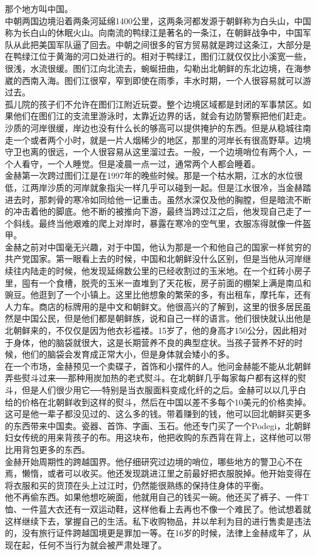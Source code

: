 那个地方叫中国。\\

中朝两国边境沿着两条河延绵1400公里，这两条河都发源于朝鲜称为白头山，中国称为长白山的休眠火山。向南流的鸭绿江是著名的一条江，在朝鲜战争中，中国军队从此把美国军队逼了回去。中朝之间很多的官方贸易就是跨过这条江，大部分是在鸭绿江位于黄海的河口处进行的。相对于鸭绿江，图们江就仅仅比小溪宽一些，很浅，水流很缓。图们江向北流去，蜿蜒扭曲，勾勒出北朝鲜的东北边境，在海参崴的西南入海。图们江很窄，窄到即使在雨季，丰水时期，一个人很容易就可以游过去。\\

孤儿院的孩子们不允许在图们江附近玩耍。整个边境区域都是封闭的军事禁区。如果他们在图们江的支流里游泳时，太靠近边界的话，就会有边防警察把他们赶走。沙质的河岸很缓，岸边也没有什么长的够高可以提供掩护的东西。但是从稳城往南走一个或者两个小时，就是一片人烟稀少的地区，那里的河岸长有很高野草。边境守卫也离的很远，一个人很容易从这里溜过去。一般，一个边境哨位有两个人，一个人看守，一个人睡觉。但是凌晨一点一过，通常两个人都会睡着。\\

金赫第一次跨过图们江是在1997年的晚些时候。那是一个枯水期，江水的水位很低，江两岸沙质的河岸就象指尖一样几乎可以碰到一起。但是江水很冷，当金赫踏进去时，那刺骨的寒冷如同给他一记重击。虽然水深仅及他的胸膛，但是暗流不断的冲击着他的脚底。他不断的被推向下游，最终当跨过江之后，他发现自己走了一个斜线。最终当他艰难的爬上对岸时，暴露在寒冷的空气里，衣服冻得就像一件盔甲。\\

金赫之前对中国毫无兴趣，对于中国，他认为那是一个和他自己的国家一样贫穷的共产党国家。第一眼看上去的时候，中国和北朝鲜没什么区别，但是当他从河岸继续往内陆走的时候，他发现延绵数公里的已经收割过的玉米地。在一个红砖小房子里，囤有一个食槽，脱壳的玉米一直堆到了天花板，房子前面的棚架上满是南瓜和豌豆。他逛到了一个小镇上。这里比他想象的繁荣的多，有出租车，摩托车，还有人力车。商店的标牌用的是中文和朝鲜文。他很高兴的了解到，这里的很多居民虽然是中国公民，但是他们都是朝鲜族，说和自己一样的语言。他们很快就认出他是北朝鲜来的，不仅仅是因为他衣衫褴褛。15岁了，他的身高才150公分，因此相对于身体，他的脑袋就很大，这是长期营养不良的典型症状。当孩子营养不好的时候，他们的脑袋会发育成正常大小，但是身体就会矮小的多。\\

在一个市场，金赫预见一个卖碟子，首饰和小摆件的人。他问金赫能不能从北朝鲜弄些熨斗过来──那种用炭加热的老式熨斗。在北朝鲜几乎每家每户都有这样的熨斗，但是人们很少用它──特别是当衣服面料变成化纤的之后。金赫可以以几乎白给的价格在北朝鲜收到这样的熨斗，然后在中国以差不多每个10美元的价格卖掉。这可是他一辈子都没见过的、这么多的钱。带着赚到的钱，他可以回北朝鲜买更多的东西带来中国卖。瓷器、首饰、字画、玉石。他还专门买了一个Podegi，北朝鲜妇女传统的用来背孩子的布。用这块布，他把收购的东西背在背上，这样他可以带比用背包更多的东西。\\

金赫开始周期性的跨越国界。他仔细研究过边境的哨位，哪些地方的警卫心不在焉，懒惰，或者可以收买。他还发现跳进江里之前最好把衣服脱掉。他开始变得在将衣服和买的货顶在头上过江时，仍然能很熟练的保持住身体的平衡。\\

他不再偷东西。如果他想吃碗面，他就用自己的钱买一碗。他还买了裤子、一件T恤、一件蓝大衣还有一双运动鞋，这样他看上去再也不像一个难民了。他试想着就这样继续下去，掌握自己的生活。私下收购物品，并以牟利为目的进行售卖是违法的，没有旅行证件跨越国境更是罪加一等。在16岁的时候，法律上金赫成年了，从现在起，任何不当行为就会被严肃处理了。\\
